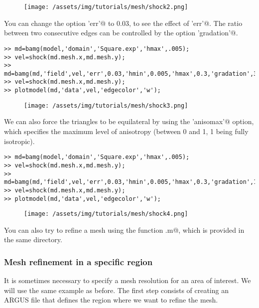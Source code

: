 \begin{figure}[H]
	\begin{center}
		\texttt{[image: /assets/img/tutorials/mesh/shock2.png]}
	\end{center}
\end{figure}
You can change the option \verb@'err'@ to 0.03, to see the effect of \verb@'err'@. The ratio between two consecutive edges can be controlled by the option \verb@'gradation'@.
\begin{verbatim}>> md=bamg(model,'domain','Square.exp','hmax',.005);
>> vel=shock(md.mesh.x,md.mesh.y);
>> md=bamg(md,'field',vel,'err',0.03,'hmin',0.005,'hmax',0.3,'gradation',3);
>> vel=shock(md.mesh.x,md.mesh.y);
>> plotmodel(md,'data',vel,'edgecolor','w');
\end{verbatim}
\begin{figure}[H]
	\begin{center}
		\texttt{[image: /assets/img/tutorials/mesh/shock3.png]}
	\end{center}
\end{figure}
We can also force the triangles to be equilateral by using the \verb@'anisomax'@ option, which specifies the maximum level of anisotropy (between 0 and 1, 1 being fully isotropic).
\begin{verbatim}>> md=bamg(model,'domain','Square.exp','hmax',.005);
>> vel=shock(md.mesh.x,md.mesh.y);
>> md=bamg(md,'field',vel,'err',0.03,'hmin',0.005,'hmax',0.3,'gradation',1.3,'anisomax',1);
>> vel=shock(md.mesh.x,md.mesh.y);
>> plotmodel(md,'data',vel,'edgecolor','w');
\end{verbatim}
\begin{figure}[H]
	\begin{center}
		\texttt{[image: /assets/img/tutorials/mesh/shock4.png]}
	\end{center}
\end{figure}
You can also try to refine a mesh using the function \verb@circles.m@, which is provided in the same directory.
\subsubsection{Mesh refinement in a specific region}%
It is sometimes necessary to specify a mesh resolution for an area of interest. We will use the same example as before. The first step consists of creating an ARGUS file that defines the region where we want to refine the mesh.

